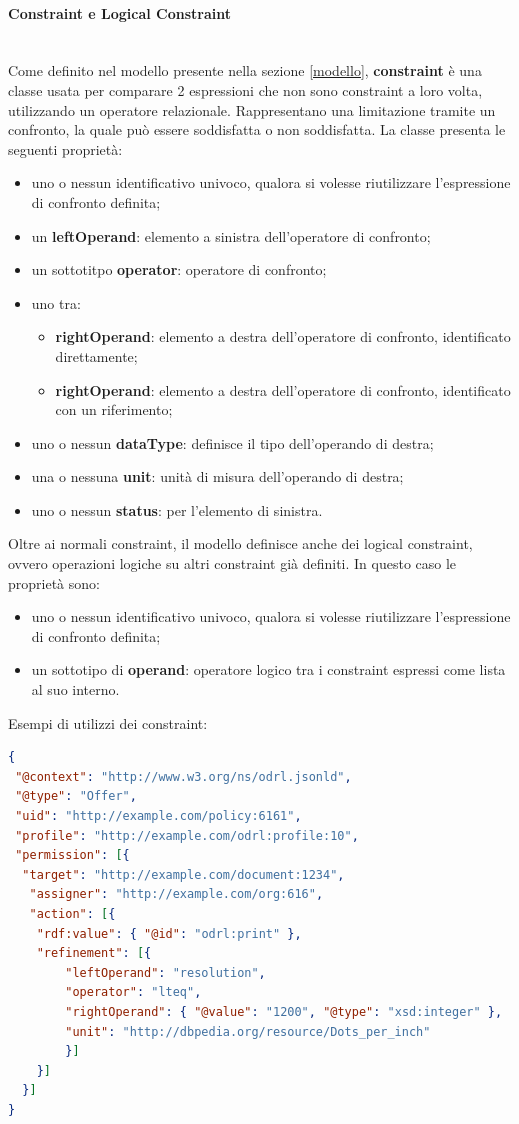 \documentclass[12pt,a4paper,twoside]{book}
\begin{document}
\paragraph{Constraint e Logical Constraint}\mbox{}\\
Come definito nel modello presente nella sezione \ref{modello}, \textbf{constraint} è una classe usata per comparare 2 espressioni che non sono constraint a loro volta, utilizzando un operatore relazionale. Rappresentano una limitazione tramite un confronto, la quale può essere soddisfatta o non soddisfatta. La classe presenta le seguenti proprietà:
\begin{itemize}
	\item uno o nessun identificativo univoco, qualora si volesse riutilizzare l'espressione di confronto definita;
	\item un \textbf{leftOperand}: elemento a sinistra dell'operatore di confronto;
	\item un sottotitpo \textbf{operator}: operatore di confronto;
	\item uno tra: 
	\begin{itemize}
		\item \textbf{rightOperand}: elemento a destra dell'operatore di confronto, identificato direttamente;
		\item \textbf{rightOperand}: elemento a destra dell'operatore di confronto, identificato con un riferimento; 
	\end{itemize} 
	\item uno o nessun \textbf{dataType}: definisce il tipo dell'operando di destra;
	\item una o nessuna \textbf{unit}: unità di misura dell'operando di destra;
	\item uno o nessun \textbf{status}: per l'elemento di sinistra.
\end{itemize}
Oltre ai normali constraint, il modello definisce anche dei logical constraint, ovvero operazioni logiche su altri constraint già definiti. In questo caso le proprietà sono:
\begin{itemize}
	\item uno o nessun identificativo univoco, qualora si volesse riutilizzare l'espressione di confronto definita;
	\item un sottotipo di \textbf{operand}: operatore logico tra i constraint espressi come lista al suo interno.
\end{itemize}
Esempi di utilizzi dei constraint: 
\begin{lstlisting}[language=json,firstnumber=1,caption={Constraint su azione: l'azione \textbf{print} è permessa solo per risoluzioni minori di 1200 dpi},captionpos=b,label=esempioRef]
{
 "@context": "http://www.w3.org/ns/odrl.jsonld",
 "@type": "Offer",
 "uid": "http://example.com/policy:6161",
 "profile": "http://example.com/odrl:profile:10",
 "permission": [{
  "target": "http://example.com/document:1234",
   "assigner": "http://example.com/org:616",
   "action": [{
  	"rdf:value": { "@id": "odrl:print" },
  	"refinement": [{
  		"leftOperand": "resolution",
  		"operator": "lteq",
  		"rightOperand": { "@value": "1200", "@type": "xsd:integer" },
  		"unit": "http://dbpedia.org/resource/Dots_per_inch"
    	}]
 	}]
  }]
}
\end{lstlisting}
\end{document}
